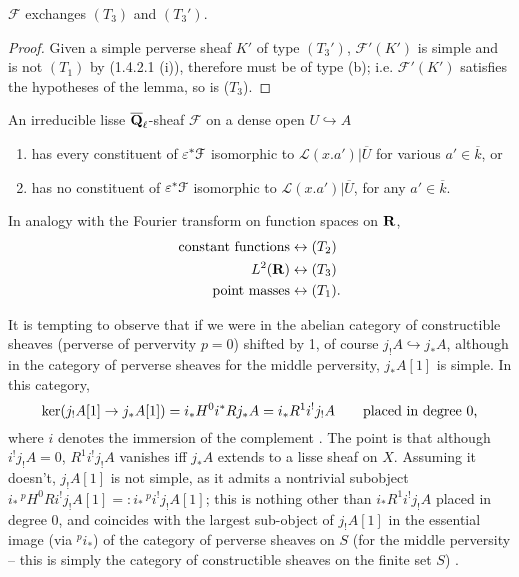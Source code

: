 \documentclass[deligne.tex]{subfiles}
\begin{document}
\begin{corollary*}
	$\mathscr F$ exchanges $(T_3)$ and $(T_3')$.
\end{corollary*}
\begin{proof}
	Given a simple perverse sheaf $K'$ of type $(T_3')$, $\mathscr F'(K')$
	is simple and is not $(T_1)$ by (1.4.2.1 (i)), therefore must be of type
	(b); i.e. $\mathscr F'(K')$ satisfies the hypotheses of the lemma,
	so is ($T_3$).
\end{proof}
\begin{corollary*}[Dichotomy]
	An irreducible lisse $\overline{\mathbf{Q}}_\ell$-sheaf $\mathcal F$ on a 
	dense open $U\hookrightarrow A$
	\begin{enumerate}[label=(\greek*)]
	\item has every constituent of $\varepsilon^*\mathcal F$ isomorphic to $\mathscr L(x.a')|\overline U$ for various $a'\in\overline k$, or
	\item has no constituent of $\varepsilon^*\mathcal F$ isomorphic to $\mathscr L(x.a')|\overline U$, for any $a'\in\overline k$.
	\end{enumerate}
\end{corollary*}
\begin{remark}
	In analogy with the Fourier transform on function spaces on $\mathbf{R}$,
	\begin{align*}
		\text{constant functions}&\leftrightarrow (T_2) \\
		L^2(\mathbf{R})&\leftrightarrow (T_3) \\
		\text{point masses}&\leftrightarrow (T_1).
	\end{align*}
\end{remark}
\begin{remark}
	It is tempting to observe that if we were in the abelian category of
	constructible sheaves (perverse of pervervity $p=0$) shifted by 1, of
	course $j_!A\hookrightarrow j_*A$, although in the category of perverse
	sheaves for the middle perversity, $j_*A[1]$ is simple.
	In this category,
	\begin{equation*}
		\ker(j_!A[1]\rightarrow j_*A[1])=i_*H^0i^*Rj_*A=i_*R^1i^!j_!A
		\qquad\text{placed in degree 0,}
	\end{equation*}
	where $i$ denotes the immersion of the complement \cite[4.1.2]{BBD}.
	The point is that although $i^!j_!A=0$, $R^1i^!j_!A$ vanishes iff
	$j_*A$ extends to a lisse sheaf on $X$. Assuming it doesn't, $j_!A[1]$
	is not simple, as it admits a nontrivial subobject
	$i_*\,^pH^0Ri^!j_!A[1]=:i_*\,^pi^!j_!A[1]$; this is nothing other than
	$i_*R^1i^!j_!A$ placed in degree 0, and coincides with the largest
	sub-object of $j_!A[1]$ in the essential image (via $^pi_*$) of the
	category of perverse sheaves on $S$ (for the middle perversity – this is
	simply the category of constructible sheaves on the finite set $S$)
	\cite[1.4.25]{BBD}.
\end{remark}
\end{document}
